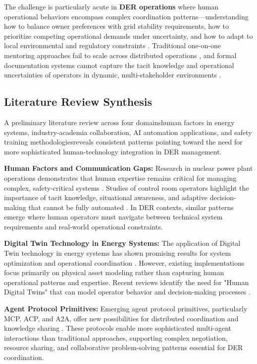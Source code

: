 \documentclass[12pt,a4paper]{article}
\newcommand{\emdash}{\textemdash}
\begin{document}
The challenge is particularly acute in \textbf{DER operations} where human operational behaviors encompass complex coordination patterns—understanding how to balance owner preferences with grid stability requirements, how to prioritize competing operational demands under uncertainty, and how to adapt to local environmental and regulatory constraints \cite{10.1109/ACCESS.2024.3387400}. Traditional one-on-one mentoring approaches fail to scale across distributed operations \cite{10.1007/s44163-022-00020-w}, and formal documentation systems cannot capture the tacit knowledge and operational uncertainties of operators in dynamic, multi-stakeholder environments \cite{10.1016/j.apergo.2018.07.016}.

\subsection{Literature Review Synthesis}

A preliminary literature review across four domains\emdash{}human factors in energy systems, industry-academia collaboration, AI automation applications, and safety training methodologies\emdash{}reveals consistent patterns pointing toward the need for more sophisticated human-technology integration in DER management.

\textbf{Human Factors and Communication Gaps:} Research in nuclear power plant operations demonstrates that human expertise remains critical for managing complex, safety-critical systems \cite{10.1108/13552510610654510}. Studies of control room operators highlight the importance of tacit knowledge, situational awareness, and adaptive decision-making that cannot be fully automated \cite{10.1049/OAP-CIRED.2017.1107}. In DER contexts, similar patterns emerge where human operators must navigate between technical system requirements and real-world operational constraints.

\textbf{Digital Twin Technology in Energy Systems:} The application of Digital Twin technology in energy systems has shown promising results for system optimization and operational coordination \cite{10.1016/j.esr.2024.101334}. However, existing implementations focus primarily on physical asset modeling rather than capturing human operational patterns and expertise. Recent reviews identify the need for "Human Digital Twins" that can model operator behavior and decision-making processes \cite{10.1109/ETFA61755.2024.10711109}.

\textbf{Agent Protocol Primitives:} Emerging agent protocol primitives, particularly MCP, ACP, and A2A, offer new possibilities for distributed coordination and knowledge sharing \cite{10.5220/0001894702000205}. These protocols enable more sophisticated multi-agent interactions than traditional approaches, supporting complex negotiation, resource sharing, and collaborative problem-solving patterns essential for DER coordination.
\end{document}
